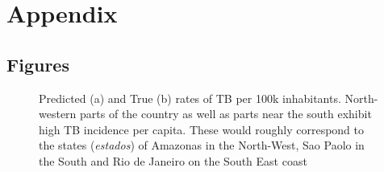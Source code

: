 
\section{Appendix}

\subsection{Figures}

\begin{figure}[H]
	\centering
	\qquad
	\caption{Predicted (a) and True (b) rates of TB per 100k inhabitants. North-western parts of the country as well as parts near the south exhibit high TB incidence per capita. These would roughly correspond to the states (\textit{estados}) of Amazonas in the North-West, Sao Paolo in the South and Rio de Janeiro on the South East coast}%
	\label{fig:pred_TB_rate_map}%
\end{figure}

